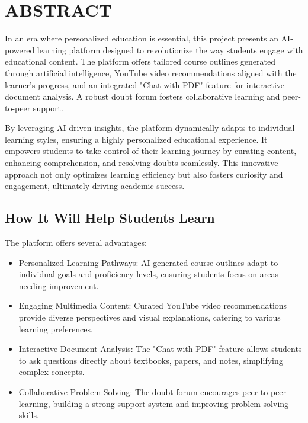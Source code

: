 \chapter*{ABSTRACT}

In an era where personalized education is essential, this project presents an AI-powered learning platform designed to revolutionize the way students engage with educational content. The platform offers tailored course outlines generated through artificial intelligence, YouTube video recommendations aligned with the learner's progress, and an integrated "Chat with PDF" feature for interactive document analysis. A robust doubt forum fosters collaborative learning and peer-to-peer support. 

By leveraging AI-driven insights, the platform dynamically adapts to individual learning styles, ensuring a highly personalized educational experience. It empowers students to take control of their learning journey by curating content, enhancing comprehension, and resolving doubts seamlessly. This innovative approach not only optimizes learning efficiency but also fosters curiosity and engagement, ultimately driving academic success. 

\section*{How It Will Help Students Learn}

The platform offers several advantages:

\begin{itemize}
    \item Personalized Learning Pathways: AI-generated course outlines adapt to individual goals and proficiency levels, ensuring students focus on areas needing improvement.
    \item Engaging Multimedia Content: Curated YouTube video recommendations provide diverse perspectives and visual explanations, catering to various learning preferences.
    \item Interactive Document Analysis: The "Chat with PDF" feature allows students to ask questions directly about textbooks, papers, and notes, simplifying complex concepts.
    \item Collaborative Problem-Solving: The doubt forum encourages peer-to-peer learning, building a strong support system and improving problem-solving skills.
\end{itemize}

\cleardoublepage
